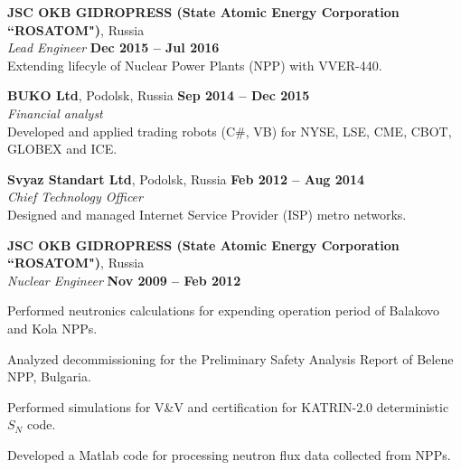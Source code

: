 \documentclass[margin,line]{resume}
\begin{document}
\begin{resume}
    \textbf{JSC OKB GIDROPRESS (State Atomic Energy Corporation ``ROSATOM")}, Russia \\
		\textsl{Lead Engineer} \hfill \textbf{Dec 2015 -- Jul 2016}\\
                Extending lifecyle of Nuclear Power Plants (NPP) with VVER-440.

    \textbf{BUKO Ltd}, Podolsk, Russia \hfill \textbf{Sep 2014 -- Dec 2015}\\
		\textsl{Financial analyst}\\
		Developed and applied trading robots (C\#, VB) for NYSE, LSE, CME, CBOT, GLOBEX and ICE.

    \textbf{Svyaz Standart Ltd}, Podolsk, Russia \hfill \textbf{Feb 2012 -- Aug 2014}\\
		\textsl{Chief Technology Officer}\\
		Designed and managed Internet Service Provider (ISP) metro networks.

    \textbf{JSC OKB GIDROPRESS (State Atomic Energy Corporation ``ROSATOM")}, Russia \\
		\textsl{Nuclear Engineer} \hfill \textbf{Nov 2009 -- Feb 2012}\\
                \vspace{-4mm}\begin{list2}
				\item Performed neutronics calculations for expending operation period of Balakovo and Kola NPPs.
				\item Analyzed decommissioning for the Preliminary Safety Analysis Report of Belene NPP, Bulgaria.
				\item Performed simulations for V\&V and certification for KATRIN-2.0 deterministic $S_N$ code.
				\item Developed a Matlab code for processing neutron flux data collected from NPPs.
                \end{list2}


\end{resume}
\end{document}
